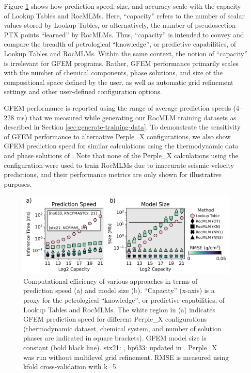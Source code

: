 \documentclass[draft,linenumbers]{agujournal2018}
\begin{document}
Figure \ref{fig:rocmlm-performance} shows how prediction speed, size, and accuracy scale with the capacity of Lookup Tables and RocMLMs. Here, ``capacity'' refers to the number of scalar values stored by Lookup Tables, or alternatively, the number of pseudosection PTX points ``learned'' by RocMLMs. Thus, ``capacity'' is intended to convey and compare the breadth of petrological ``knowledge'', or predictive capabilities, of Lookup Tables and RocMLMs. Within the same context, the notion of ``capacity'' is irrelevant for GFEM programs. Rather, GFEM performance primarily scales with the number of chemical components, phase solutions, and size of the compositional space defined by the user, as well as automatic grid refinement settings and other user-defined configuration options.

GFEM performance is reported using the range of average prediction speeds (4--228 ms) that we measured while generating our RocMLM training datasets as described in Section \ref{sec:generate-training-data}. To demonstrate the sensitivity of GFEM performance to alternative Perple\_X configurations, we also show GFEM prediction speed for similar calculations using the thermodynamic data and phase solutions of \citet{holland2018}. Note that none of the Perple\_X calculations using the \citet{holland2018} configuration were used to train RocMLMs due to inaccurate seismic velocity predictions, and their performance metrics are only shown for illustrative purposes.



\begin{figure}[htbp]

{\centering \includegraphics[width=1\linewidth,]{rocmlm-performance} 

}

\caption{Computational efficiency of various approaches in terms of prediction speed (a) and model size (b). ``Capacity'' (x-axis) is a proxy for the petrological ``knowledge'', or predictive capabilities, of Lookup Tables and RocMLMs. The white region in (a) indicates GFEM prediction speed for different Perple\_X configurations (thermodynamic dataset, chemical system, and number of solution phases are indicated in square brackets). GFEM model size is constant (bold black line). stx21: \citet{stixrude2022}, hp633: \citet{holland2011} updated in \citet{holland2018}. Perple\_X was run without multilevel grid refinement. RMSE is measured using kfold cross-validation with k=5.}\label{fig:rocmlm-performance}
\end{figure}
\end{document}
